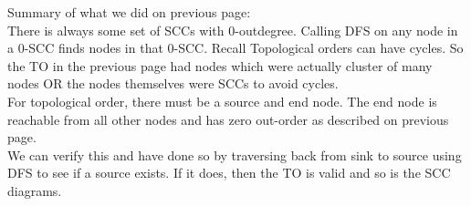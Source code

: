 \documentclass[11pt,fleqn]{article}
\begin{document}
Summary of what we did on previous page:\\
There is always some set of SCCs with 0-outdegree. Calling DFS on any node in a 0-SCC finds nodes in that 0-SCC. Recall Topological orders can have cycles. So the TO in the previous page had nodes which were actually cluster of many nodes OR the nodes themselves were SCCs to avoid cycles.\\

For topological order, there must be a source and end node. The end node is reachable from all other nodes and has zero out-order as described on previous page.\\

We can verify this and have done so by traversing back from sink to source using DFS to see if a source exists. If it does, then the TO is valid and so is the SCC diagrams.
\end{document}
